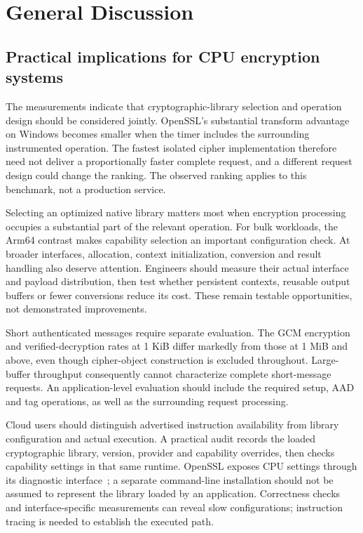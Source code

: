 \section{General Discussion}
\label{sec:discussion}
\subsection{Practical implications for CPU encryption systems}
The measurements indicate that cryptographic-library selection and operation design should be considered jointly. OpenSSL's substantial transform advantage on Windows becomes smaller when the timer includes the surrounding instrumented operation. The fastest isolated cipher implementation therefore need not deliver a proportionally faster complete request, and a different request design could change the ranking. The observed ranking applies to this benchmark, not a production service.

Selecting an optimized native library matters most when encryption processing occupies a substantial part of the relevant operation. For bulk workloads, the Arm64 contrast makes capability selection an important configuration check. At broader interfaces, allocation, context initialization, conversion and result handling also deserve attention. Engineers should measure their actual interface and payload distribution, then test whether persistent contexts, reusable output buffers or fewer conversions reduce its cost. These remain testable opportunities, not demonstrated improvements.

Short authenticated messages require separate evaluation. The GCM encryption and verified-decryption rates at 1 KiB differ markedly from those at 1 MiB and above, even though cipher-object construction is excluded throughout. Large-buffer throughput consequently cannot characterize complete short-message requests. An application-level evaluation should include the required setup, AAD and tag operations, as well as the surrounding request processing.

Cloud users should distinguish advertised instruction availability from library configuration and actual execution. A practical audit records the loaded cryptographic library, version, provider and capability overrides, then checks capability settings in that same runtime. OpenSSL exposes CPU settings through its diagnostic interface~\cite{opensslinfo}; a separate command-line installation should not be assumed to represent the library loaded by an application. Correctness checks and interface-specific measurements can reveal slow configurations; instruction tracing is needed to establish the executed path.

